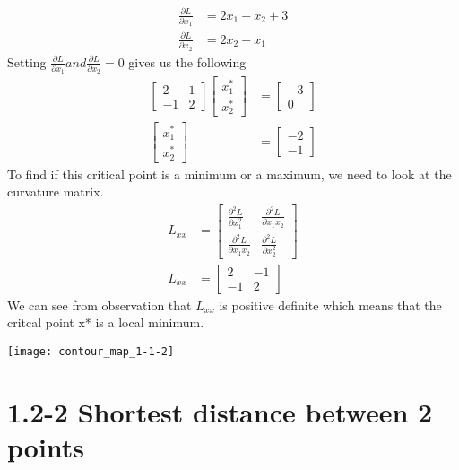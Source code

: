 \documentclass{article}
\begin{document}
  \begin{align*}
    \frac{\partial L}{\partial x_1} &= 2x_1 - x_2 + 3 \tag{2.2} \\
    \frac{\partial L}{\partial x_2} &= 2x_2 - x_1 \tag{2.3}
  \end{align*}
  Setting $\frac{\partial L}{\partial x_1} and \frac{\partial L}{\partial x_2} = 0$ gives us the following
  \begin{align*}
    \begin{bmatrix}
      2 & 1 \\
      -1 & 2
    \end{bmatrix}
    \begin{bmatrix}
      x^*_1 \\
      x^*_2
    \end{bmatrix} &= 
    \begin{bmatrix}
      -3 \\
      0
    \end{bmatrix} \\
    \begin{bmatrix}
      x^*_1 \\
      x^*_2
    \end{bmatrix} &= 
    \begin{bmatrix}
      -2 \\
      -1
    \end{bmatrix} \tag{2.4}
  \end{align*} 
  To find if this critical point is a minimum or a maximum, we need to look at the curvature matrix.
  \begin{align*}
    L_{xx} &= 
    \begin{bmatrix}
      \frac{\partial^2L}{\partial x_1^2} & \frac{\partial^2L}{\partial x_1x_2} \\
      \frac{\partial^2L}{\partial x_1x_2} & \frac{\partial^2L}{\partial x_2^2}
    \end{bmatrix} \\
    L_{xx} &= 
    \begin{bmatrix}
      2 & -1 \\
      -1 & 2
    \end{bmatrix} \tag{2.5}
  \end{align*}
  We can see from observation that $L_{xx}$ is positive definite which means that the critcal point x* is a local minimum.
     
  \texttt{[image: contour\_map\_1-1-2]}
  
  \newpage

  \section{1.2-2 Shortest distance between 2 points}
\end{document}
